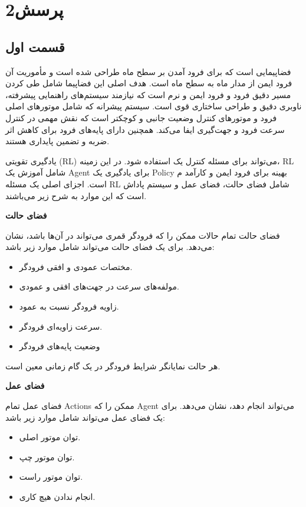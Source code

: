 \documentclass{article}
\begin{document}
	
	
	
	\tableofcontents \clearpage
	\listoffigures \clearpage
	\listoftables \clearpage
	\lstlistoflistings \clearpage
	\newpage

\section{پرسش2}

\subsection{قسمت اول}

 فضاپیمایی است که برای فرود آمدن بر سطح ماه طراحی شده است و مأموریت آن فرود ایمن از مدار ماه به سطح ماه است. هدف اصلی این فضاپیما شامل طی کردن مسیر دقیق فرود و فرود ایمن و نرم است که نیازمند سیستم‌های راهنمایی پیشرفته، ناوبری دقیق و طراحی ساختاری قوی است. سیستم پیشرانه که شامل موتورهای اصلی فرود و موتورهای کنترل وضعیت جانبی و کوچکتر است که نقش مهمی در کنترل سرعت فرود و جهت‌گیری ایفا می‌کند.  همچنین دارای پایه‌های فرود برای کاهش اثر ضربه و تضمین پایداری هستند. 
 
 یادگیری تقویتی (RL) می‌تواند برای مسئله کنترل یک
استفاده شود. در این زمینه، RL شامل آموزش یک Agent برای یادگیری یک Policy بهینه برای فرود ایمن و کارآمد م
 است. اجزای اصلی یک مسئله RL شامل فضای حالت، فضای عمل و سیستم پاداش است که این موارد به شرح زیر می‌باشند.
 
 \textbf{فضای حالت}
 
 فضای حالت تمام حالات ممکن را که فرودگر قمری می‌تواند در آن‌ها باشد، نشان می‌دهد. برای یک  فضای حالت می‌تواند شامل موارد زیر باشد:
  \begin{itemize}
 \item مختصات عمودی و افقی فرودگر.
 \item مولفه‌های سرعت در جهت‌های افقی و عمودی.
 \item زاویه فرودگر نسبت به عمود.
 \item سرعت زاویه‌ای فرودگر.
 \item وضعیت پایه‌های فرودگر
  \end{itemize}
 هر حالت نمایانگر شرایط فرودگر در یک گام زمانی معین است.
 
 \textbf{فضای عمل}
 
 فضای عمل تمام Actions ممکن را که Agent می‌تواند انجام دهد، نشان می‌دهد. برای یک  فضای عمل می‌تواند شامل موارد زیر باشد:
\begin{itemize}
 \item توان موتور اصلی.
 \item توان موتور چپ.
 \item توان موتور راست.
 \item انجام ندادن هیچ کاری.
\end{itemize}
\end{document}
